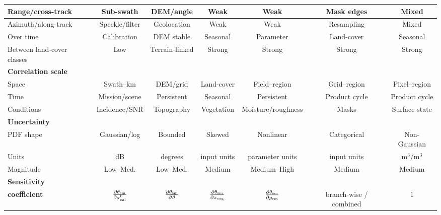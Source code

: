 \begin{table}[H]
{\begin{tabular}{|l|c|c|c|c|c|c|}
    Range/cross-track & Sub-swath & DEM/angle & Weak & Weak & Mask edges & Mixed \\ \hline
    Azimuth/along-track & Speckle/filter & Geolocation & Weak & Weak & Resampling & Mixed \\ \hline
    Over time & Calibration & DEM stable & Seasonal & Parameter & Land-cover & Seasonal \\ \hline
    Between land-cover classes & Low & Terrain-linked & Strong & Strong & Strong & Strong \\ \hline
    \textbf{Correlation scale} &  & & &  &  &  \\ \hline
    Space & Swath--km & DEM/grid & Land-cover & Field--region & Grid--region & Pixel--region\\ \hline
    Time & Mission/scene & Persistent & Seasonal & Persistent & Product cycle & Product cycle\\ \hline
    Conditions & Incidence/SNR & Topography & Vegetation & Moisture/roughness & Masks & Surface state \\ \hline
    \textbf{Uncertainty} &  & &  &  &&  \\ \hline
    PDF shape & Gaussian/log & Bounded & Skewed & Nonlinear & Categorical & Non-Gaussian \\ \hline
    Units & dB & degrees & input units & parameter units & input units & m$^3$/m$^3$ \\ \hline
    Magnitude & Low--Med. & Low--Med. & Medium & Medium--High & Medium & Medium \\ \hline
    \textbf{Sensitivity} & & & &  &  &  \\
    \textbf{coefficient} & $\frac{\partial\theta_{\rm sm}}{\partial \sigma^0_{\rm cal}}$ & $\frac{\partial\theta_{\rm sm}}{\partial \vartheta}$ & $\frac{\partial\theta_{\rm sm}}{\partial x_{\rm veg}}$ & $\frac{\partial\theta_{\rm sm}}{\partial p_{\rm ret}}$ & branch-wise / combined & 1 \\ \hline
  \end{tabular}%
  }

  \label{tab:sm_effects_table}
\end{table}



